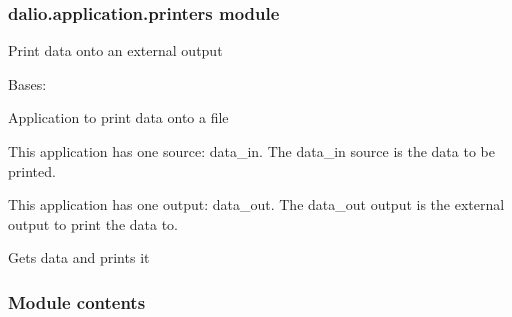 \documentclass[letterpaper,10pt,english]{sphinxmanual}
\begin{document}
\subsubsection{dalio.application.printers module}
\label{\detokenize{dalio.application:module-dalio.application.printers}}\label{\detokenize{dalio.application:dalio-application-printers-module}}
Print data onto an external output

\begin{fulllineitems}
\label{\detokenize{dalio.application:dalio.application.printers.FilePrinter}}
Bases: {\hyperref[\detokenize{dalio.application:dalio.application.application.Application}]{}}

Application to print data onto a file

This application has one source: data\_in. The data\_in source is the data
to be printed.

This application has one output: data\_out. The data\_out output is the
external output to print the data to.

\begin{fulllineitems}
\label{\detokenize{dalio.application:dalio.application.printers.FilePrinter.run}}
Gets data and prints it

\end{fulllineitems}


\end{fulllineitems}



\subsubsection{Module contents}
\label{\detokenize{dalio.application:module-dalio.application}}\label{\detokenize{dalio.application:module-contents}}
\end{document}
